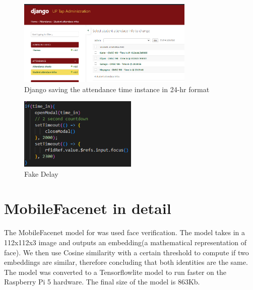 \begin{figure}[h] %
	\centering
	\includegraphics[width=0.75\textwidth]{figures/chapter4/backendrecord.png} %
	\caption{Django saving the attendance time instance in 24-hr format}
	\label{fig:record}
\end{figure}
\begin{figure}[h] %
	\centering
	\includegraphics[width=0.5\textwidth]{figures/chapter4/delay.png} %
	\caption{Fake Delay}
	\label{fig:delay}
\end{figure}

\clearpage
\section{MobileFacenet in detail}
The MobileFacenet model for was used face verification. The model takes in a 112x112x3 image and outputs an embedding(a mathematical representation of face). We then use Cosine similarity with a certain threshold to compute if two embeddings are similar, therefore concluding that both identities are the same. The model was converted to a Tensorflowlite model to run faster on the Raspberry Pi 5 hardware. The final size of the model is 863Kb.

